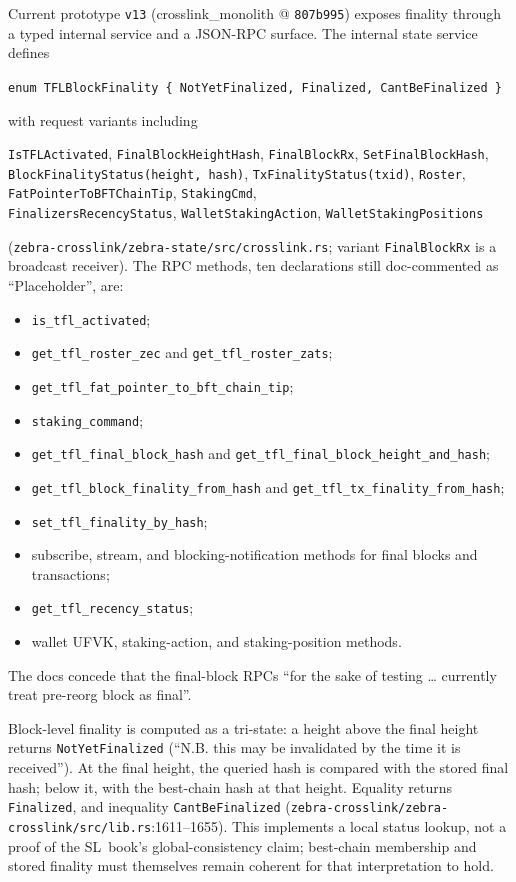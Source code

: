 \documentclass[11pt,a4paper]{article}
\theoremstyle{definition}
\begin{document}
Current prototype \texttt{v13} (crosslink\_monolith @
\texttt{807b995}) exposes
finality through a typed internal service and a JSON-RPC surface. The
internal state service defines
\begin{center}
\texttt{enum TFLBlockFinality \{ NotYetFinalized, Finalized,
CantBeFinalized \}}
\end{center}
with request variants including
\begin{center}
\texttt{IsTFLActivated}, \texttt{FinalBlockHeightHash},
\texttt{FinalBlockRx}, \texttt{SetFinalBlockHash},\\
\texttt{BlockFinalityStatus(height, hash)},
\texttt{TxFinalityStatus(txid)}, \texttt{Roster},\\
\texttt{FatPointerToBFTChainTip}, \texttt{StakingCmd},\\
\texttt{FinalizersRecencyStatus}, \texttt{WalletStakingAction},
\texttt{WalletStakingPositions}
\end{center}
(\texttt{zebra-crosslink/zebra-state/src/crosslink.rs}; variant
\texttt{FinalBlockRx} is a broadcast receiver). The RPC methods, ten
declarations still doc-commented as ``Placeholder'', are:
\begin{itemize}[itemsep=1pt]
\item \texttt{is\_tfl\_activated};
\item \texttt{get\_tfl\_roster\_zec} and \texttt{get\_tfl\_roster\_zats};
\item \texttt{get\_tfl\_fat\_pointer\_to\_bft\_chain\_tip};
\item \texttt{staking\_command};
\item \texttt{get\_tfl\_final\_block\_hash} and
  \texttt{get\_tfl\_final\_block\_height\_and\_hash};
\item \texttt{get\_tfl\_block\_finality\_from\_hash} and
  \texttt{get\_tfl\_tx\_finality\_from\_hash};
\item \texttt{set\_tfl\_finality\_by\_hash};
\item subscribe, stream, and blocking-notification methods for final blocks
  and transactions;
\item \texttt{get\_tfl\_recency\_status};
\item wallet UFVK, staking-action, and staking-position methods.
\end{itemize}
The docs concede that the final-block RPCs ``for the sake of testing
\ldots{} currently treat pre-reorg block as final''.

Block-level finality is computed as a tri-state: a height above the final
height returns \texttt{NotYetFinalized} (``N.B. this may be invalidated by
the time it is received''). At the final height, the queried hash is
compared with the stored final hash; below it, with the best-chain hash
at that height. Equality returns \texttt{Finalized}, and inequality
\texttt{CantBeFinalized}
(\texttt{zebra-crosslink/zebra-crosslink/src/lib.rs}:1611--1655).
This implements a local status lookup, not a proof of the SL~book's
global-consistency claim; best-chain membership and stored finality must
themselves remain coherent for that interpretation to hold.
\end{document}
